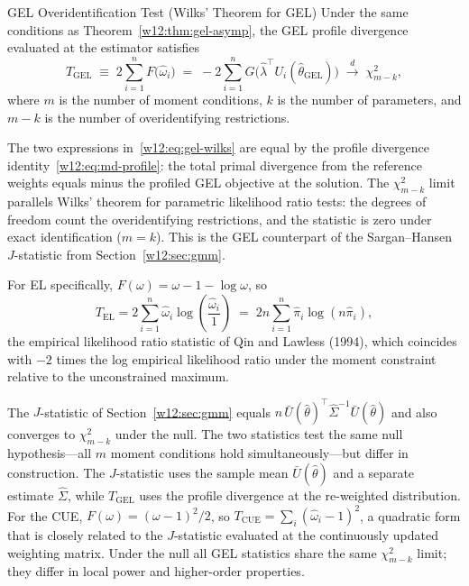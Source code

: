 \documentclass[master.tex]{subfiles}
\begin{document}
\begin{thm}{GEL Overidentification Test (Wilks' Theorem for GEL)
  \citep{neweysmith2004}}
\label{w12:thm:gel-wilks}
Under the same conditions as Theorem~\ref{w12:thm:gel-asymp}, the
GEL profile divergence evaluated at the estimator satisfies
\begin{equation}
  T_{\mathrm{GEL}}
  \;\equiv\;
  2\sum_{i=1}^n F\!\bigl(\hat\omega_i\bigr)
  \;=\;
  -2\sum_{i=1}^n G\!\bigl(\hat\lambda^\top U_i(\hat\theta_{\mathrm{GEL}})\bigr)
  \;\xrightarrow{d}\;
  \chi^2_{m-k},
  \label{w12:eq:gel-wilks}
\end{equation}
where $m$ is the number of moment conditions, $k$ is the number of
parameters, and $m - k$ is the number of overidentifying
restrictions.
\end{thm}

The two expressions in~\eqref{w12:eq:gel-wilks} are equal by the
profile divergence identity~\eqref{w12:eq:md-profile}: the total
primal divergence from the reference weights equals minus the
profiled GEL objective at the solution.  The $\chi^2_{m-k}$ limit
parallels Wilks' theorem for parametric likelihood ratio tests: the
degrees of freedom count the overidentifying restrictions, and the
statistic is zero under exact identification ($m = k$).  This is the
GEL counterpart of the Sargan--Hansen $J$-statistic from
Section~\ref{w12:sec:gmm}.

For EL specifically, $F(\omega) = \omega - 1 - \log\omega$, so
\[
  T_{\mathrm{EL}}
  = 2\sum_{i=1}^n \hat\omega_i \log\!\left(\frac{\hat\omega_i}{1}\right)
  \;=\; 2n\sum_{i=1}^n \hat\pi_i \log(n\hat\pi_i),
\]
the empirical likelihood ratio statistic of Qin and Lawless (1994),
which coincides with $-2$ times the log empirical likelihood ratio
under the moment constraint relative to the unconstrained maximum.

\begin{remark}
The $J$-statistic of Section~\ref{w12:sec:gmm} equals
$n\,\bar{U}(\hat\theta)^\top \hat\Sigma^{-1} \bar{U}(\hat\theta)$
and also converges to $\chi^2_{m-k}$ under the null.  The two
statistics test the same null hypothesis---all $m$ moment conditions
hold simultaneously---but differ in construction.  The $J$-statistic
uses the sample mean $\bar{U}(\hat\theta)$ and a separate estimate
$\hat\Sigma$, while $T_{\mathrm{GEL}}$ uses the profile divergence
at the re-weighted distribution.  For the CUE, $F(\omega) =
(\omega-1)^2/2$, so $T_{\mathrm{CUE}} = \sum_i (\hat\omega_i - 1)^2$,
a quadratic form that is closely related to the $J$-statistic evaluated
at the continuously updated weighting matrix.  Under the null all GEL
statistics share the same $\chi^2_{m-k}$ limit; they differ in local
power and higher-order properties.
\end{remark}
\end{document}
